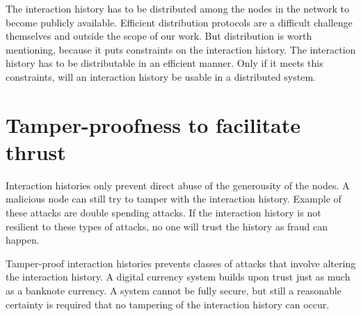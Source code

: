 The interaction history has to be distributed among the nodes in the network
to become publicly available.
Efficient distribution protocols are a difficult challenge themselves and outside the scope of our work.
But distribution is worth mentioning, because it puts constraints on the interaction history.
The interaction history has to be distributable in an efficient manner.
Only if it meets this constraints, will an interaction history be usable in a distributed system.

\section{Tamper-proofness to facilitate thrust}

Interaction histories only prevent direct abuse of the generousity of the nodes.
A malicious node can still try to tamper with the interaction history.
Example of these attacks are double spending attacks.
If the interaction history is not resilient to these types of attacks, 
no one will trust the history as fraud can happen.

Tamper-proof interaction histories prevents classes of attacks that involve altering the interaction history.
A digital currency system builds upon trust just as much as a banknote currency.
A system cannot be fully secure, 
but still a reasonable certainty is required that no tampering of the interaction history can occur.
